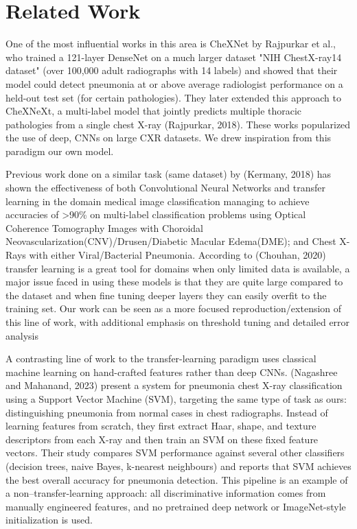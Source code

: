 \documentclass[11pt]{article}
\begin{document}
\section{Related Work}


One of the most influential works in this area is CheXNet by Rajpurkar et al., who trained a 121-layer DenseNet on a much larger dataset "NIH ChestX-ray14 dataset" (over 100,000 adult radiographs with 14 labels) and showed that their model could detect pneumonia at or above average radiologist performance on a held-out test set (for certain pathologies). They later extended this approach to CheXNeXt, a multi-label model that jointly predicts multiple thoracic pathologies from a single chest X-ray (Rajpurkar, 2018). These works popularized the use of deep, CNNs on large CXR datasets. We drew inspiration from this paradigm our own model.


Previous work done on a similar task (same dataset) by (Kermany, 2018) has shown the effectiveness of both Convolutional Neural Networks and transfer learning in the domain medical image classification managing to achieve accuracies of >90\% on multi-label classification problems using Optical Coherence Tomography Images with Choroidal Neovascularization(CNV)/Drusen/Diabetic Macular Edema(DME); and Chest X-Rays with either Viral/Bacterial Pneumonia.  According to (Chouhan, 2020) transfer learning is a great tool for domains when only limited data is available, a major issue faced in using these models is that they are quite large compared to the dataset and when fine tuning deeper layers they can easily overfit to the training set. Our work can be seen as a more focused reproduction/extension of this line of work, with additional emphasis on threshold tuning and detailed error analysis


A contrasting line of work to the transfer-learning paradigm uses classical machine learning on hand-crafted features rather than deep CNNs. (Nagashree and Mahanand, 2023) present a system for pneumonia chest X-ray classification using a Support Vector Machine (SVM), targeting the same type of task as ours: distinguishing pneumonia from normal cases in chest radiographs. Instead of learning features from scratch, they first extract Haar, shape, and texture descriptors from each X-ray and then train an SVM on these fixed feature vectors. Their study compares SVM performance against several other classifiers (decision trees, naive Bayes, k-nearest neighbours) and reports that SVM achieves the best overall accuracy for pneumonia detection. This pipeline is an example of a non–transfer-learning approach: all discriminative information comes from manually engineered features, and no pretrained deep network or ImageNet-style initialization is used.
\end{document}
